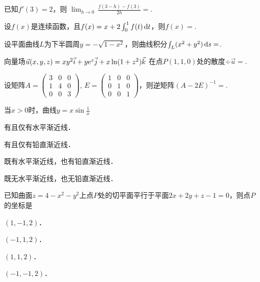 \documentclass[plain,noanswer,medmath]{../../template/jnuexam}
\begin{document}




\begin{problem}
已知$f'(3)=2$，则 $\lim_{h\to 0}\,\frac{f(3-h)-f(3)}{2h}=$\fillin{}.
\end{problem}


\begin{problem}
设$f(x)$是连续函数，且$f(x)=x+2\int_0^1f(t) \mathop{}\!\mathrm{d} t$，则$f(x)=$\fillin{}.
\end{problem}


\begin{problem}
设平面曲线$L$为下半圆周$y=-\sqrt{1-x^2}$，则曲线积分$\int_L (x^2+y^2)\mathop{}\!\mathrm{d} s=$\fillin{}.
\end{problem}


\begin{problem}
向量场$\vec{u}(x,y,z)=xy^2\vec{i}+y\mathrm{e}^z\vec{j}+x\ln(1+z^2)\vec{k}$
在点$P(1,1,0)$处的散度$\div\vec{u}=$\fillin{}.
\end{problem}


\begin{problem}
设矩阵$A=\begin{pmatrix}
  3 & 0 & 0 \\
  1 & 4 & 0 \\
  0 & 0 & 3
\end{pmatrix}$, $E=\begin{pmatrix}
  1 & 0 & 0 \\
  0 & 1 & 0 \\
  0 & 0 & 1
\end{pmatrix}$，则逆矩阵$(A-2E)^{-1}=$\fillin{}.
\end{problem}




\begin{problem}
当$x>0$时，曲线$y=x\sin\frac{1}{x}$\pickout{}
\begin{abcd}
\item 有且仅有水平渐近线．
\item 有且仅有铅直渐近线．
\item 既有水平渐近线，也有铅直渐近线．
\item 既无水平渐近线，也无铅直渐近线．
\end{abcd}
\end{problem}


\begin{problem}
已知曲面$z=4-x^2-y^2$上点$P$处的切平面平行于平面$2x+2y+z-1=0$，则点$P$的坐标是\pickout{}
\begin{abcd}
\item $(1,-1,2)$．
\item $(-1,1,2)$．
\item $(1,1,2)$．
\item $(-1,-1,2)$．
\end{abcd}
\end{problem}
\end{document}

